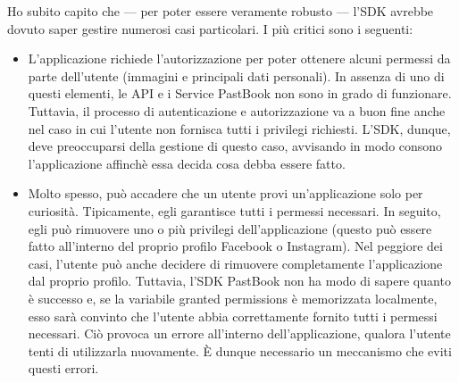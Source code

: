 				
				\noindent Ho subito capito che — per poter essere veramente robusto — l'SDK avrebbe dovuto saper gestire numerosi
				casi particolari. I più critici sono i seguenti:
				\begin{itemize}
					\item L'applicazione richiede l'autorizzazione per poter ottenere alcuni permessi da parte dell'utente
					(immagini e principali dati personali). In assenza di uno di questi elementi, le API e i Service PastBook non
					sono in grado di funzionare. Tuttavia, il processo di autenticazione e autorizzazione va a buon fine anche
					nel caso in cui l'utente non fornisca tutti i privilegi richiesti. L'SDK, dunque, deve preoccuparsi della
					gestione di questo caso, avvisando in modo consono l'applicazione affinchè essa decida cosa debba essere
					fatto.
					\item Molto spesso, può accadere che un utente provi un'applicazione solo per curiosità. Tipicamente, egli
					garantisce tutti i permessi necessari. In seguito, egli può rimuovere uno o più privilegi dell'applicazione
					(questo può essere fatto all'interno del proprio profilo Facebook o Instagram). Nel peggiore dei casi,
					l'utente può anche decidere di rimuovere completamente l'applicazione dal proprio profilo. 
					Tuttavia, l'SDK PastBook non ha modo di sapere quanto è successo e, se la variabile granted permissions è
					memorizzata localmente, esso sarà convinto che l'utente abbia correttamente fornito tutti i permessi
					necessari. Ciò provoca un errore all'interno dell'applicazione, qualora l'utente tenti di utilizzarla
					nuovamente. È dunque necessario un meccanismo che eviti questi errori.
				\end{itemize}
